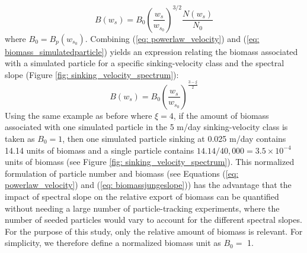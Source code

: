 \documentclass[draft,linenumbers]{agujournal2018}
\begin{document}
\begin{equation}
	B(w_s) =  B_0\left(\frac{w_s}{w_{s_0}}\right)^{3/2}\frac{N(w_s)}{N_0}
	\label{eq: biomass_simulatedparticle}
\end{equation}
where $B_0 = B_p(w_{s_0})$. Combining (\ref{eq: powerlaw_velocity}) and (\ref{eq: biomass_simulatedparticle}) yields an expression relating the biomass associated with a simulated particle for a specific sinking-velocity class and the spectral slope (Figure \ref{fig: sinking_velocity_spectrum}):
\begin{equation}
	B(w_s) = B_0\left(\frac{w_s}{w_{s_0}}\right)^{\frac{3-\xi}{2}}
	\label{eq: biomassjungeslope}
\end{equation}
Using the same example as before where $\xi = 4$, if the amount of biomass associated with one simulated particle in the 5 m/day sinking-velocity class is taken as $B_0 = 1$, then one simulated particle sinking at 0.025 m/day contains 14.14 units of biomass and a single particle contains $14.14/40,000 =3.5\times10^{-4}$ units of biomass (see Figure \ref{fig: sinking_velocity_spectrum}). This normalized formulation of particle number and biomass (see Equations (\ref{eq: powerlaw_velocity}) and (\ref{eq: biomassjungeslope})) has the advantage that the impact of spectral slope on the relative export of biomass can be quantified without needing a large number of particle-tracking experiments, where the number of seeded particles would vary to account for the different spectral slopes. For the purpose of this study, only the relative amount of biomass is relevant. For simplicity, we therefore define a normalized biomass unit as $B_0=$ 1.
\end{document}
